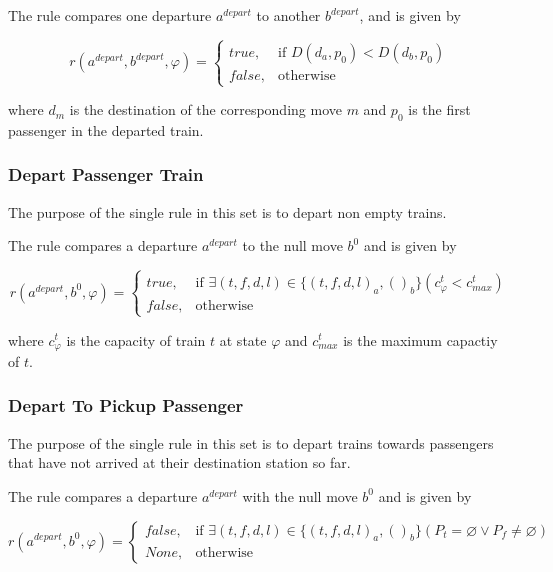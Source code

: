 \documentclass[a4paper,12pt,parskip]{article}
\begin{document}
The rule compares one departure $a^{depart}$ to another $b^{depart}$, and is 
given by

\[
    r(a^{depart}, b^{depart}, \varphi) = 
    \begin{cases}
        true,& \text{if } D(d_a, p_0) < D(d_b, p_0)\\
        false,& \text{otherwise}
    \end{cases}
\]

\noindent where $d_m$ is the destination of the corresponding move $m$ and $p_0$ is the 
first passenger in the departed train.

\subsubsection{Depart Passenger Train}
\label{rule:8}

The purpose of the single rule in this set is to depart non empty trains.

The rule compares a departure $a^{depart}$ to the null move $b^{0}$ and is given 
by

\[
    r(a^{depart}, b^{0}, \varphi) = 
    \begin{cases}
        true,& \text{if } \exists (t,f,d,l) \in \{(t,f,d,l)_a,()_b\} (c^t_{\varphi} < c^t_{max})\\
        false,& \text{otherwise}
    \end{cases}
\]

\noindent where $c^t_{\varphi}$ is the capacity of train $t$ at state $\varphi$ and $c^t_{max}$ is the maximum 
capactiy of $t$.

\subsubsection{Depart To Pickup Passenger}
\label{rule:9}

The purpose of the single rule in this set is to depart trains towards 
passengers that have not arrived at their destination station so far.

The rule compares a departure $a^{depart}$ with the null move $b^0$ and is given by

\[
    r(a^{depart}, b^{0}, \varphi) = 
    \begin{cases}
        false,& \text{if } \exists (t,f,d,l) \in \{(t,f,d,l)_a, ()_b\} (P_t = \varnothing \lor P_f \neq \varnothing)\\
        None,& \text{otherwise}
    \end{cases}
\]
\end{document}
